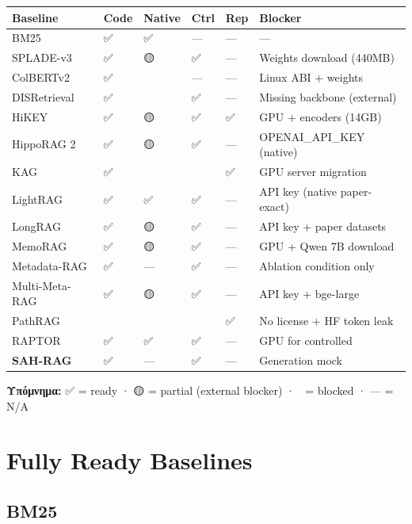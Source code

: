 \documentclass[11pt,a4paper]{article}
\begin{document}
\begin{center}
\small
\begin{longtable}{@{}L{2.6cm} C{1.0cm} C{1.0cm} C{1.0cm} C{1.0cm} L{4.0cm}@{}}
\toprule
\textbf{Baseline} & \textbf{Code} & \textbf{Native} & \textbf{Ctrl} & \textbf{Rep} & \textbf{Blocker} \\
\midrule
\endhead
BM25 & ✅ & ✅ & --- & --- & --- \\
SPLADE-v3 & ✅ & 🟡 & ✅ & --- & Weights download (440MB) \\
ColBERTv2 & ✅ & 🔴 & --- & --- & Linux ABI + weights \\
DISRetrieval & ✅ & 🔴 & ✅ & --- & Missing backbone (external) \\
HiKEY & ✅ & 🟡 & ✅ & ✅ & GPU + encoders (14GB) \\
HippoRAG 2 & ✅ & 🟡 & ✅ & --- & OPENAI\_API\_KEY (native) \\
KAG & ✅ & 🔴 & 🔴 & ✅ & GPU server migration \\
LightRAG & ✅ & ✅ & ✅ & --- & API key (native paper-exact) \\
LongRAG & ✅ & 🟡 & ✅ & --- & API key + paper datasets \\
MemoRAG & ✅ & 🟡 & ✅ & --- & GPU + Qwen 7B download \\
Metadata-RAG & ✅ & --- & ✅ & --- & Ablation condition only \\
Multi-Meta-RAG & ✅ & 🟡 & ✅ & --- & API key + bge-large \\
PathRAG & 🔴 & 🔴 & 🔴 & ✅ & No license + HF token leak \\
RAPTOR & ✅ & ✅ & ✅ & --- & GPU for controlled \\
\midrule
\textbf{SAH-RAG} & ✅ & --- & ✅ & --- & Generation mock \\
\bottomrule
\end{longtable}
\end{center}

\textbf{Υπόμνημα:} ✅ = ready · 🟡 = partial (external blocker) · 🔴 = blocked · --- = N/A

\section{Fully Ready Baselines}

\subsection{BM25}
\end{document}

